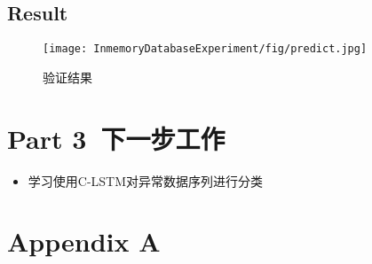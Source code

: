 \section{Result}

\begin{figure}[H]
	\centering
	\texttt{[image: InmemoryDatabaseExperiment/fig/predict.jpg]}
	\caption{验证结果}
\end{figure}


\chapter{Part 3\  下一步工作}
\begin{itemize}
    \item 学习使用C-LSTM对异常数据序列进行分类
\end{itemize}



\chapter{Appendix A}
\listoffigures

